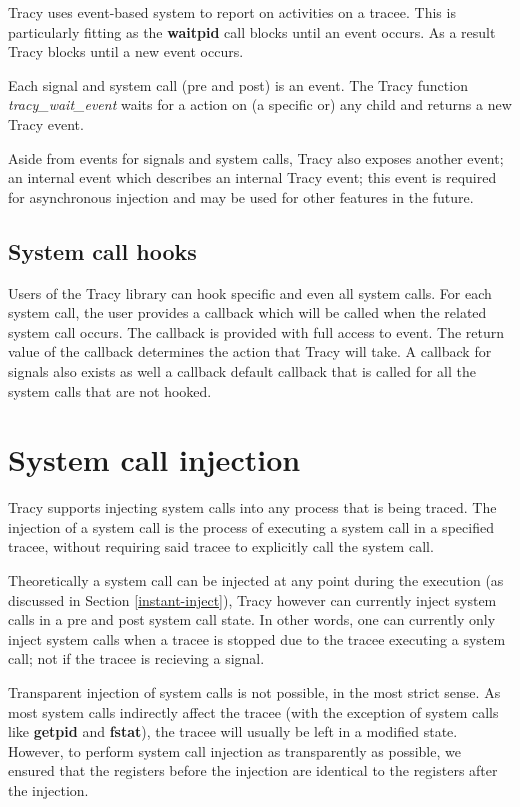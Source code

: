 \documentclass[a4paper, 10pt]{report}
\begin{document}
Tracy uses event-based system to report on activities on a tracee. This is
particularly fitting as the \textbf{waitpid} call blocks until an event
occurs. As a result Tracy blocks until a new event occurs.

Each signal and system call (pre and post) is an event.
The Tracy function \textit{tracy\_wait\_event} waits for a action on
(a specific or) any child and returns a new Tracy event.

Aside from events for signals and system calls, Tracy also exposes another
event; an internal event which describes an internal Tracy event; this event
is required for asynchronous injection and may be used for other features in
the future.

\subsection{System call hooks}

Users of the Tracy library can hook specific and even all system calls. For
each system call, the user provides a callback which will be called when
the related system call occurs. The callback is provided with full access to
event. The return value of the callback determines the action that Tracy
will take. A callback for signals also exists as well a callback default
callback that is called for all the system calls that are not hooked.

\section{System call injection}
\label{syscall-inject}

Tracy supports injecting system calls into any process that is being traced.
The injection of a system call is the process of executing a system call in
a specified tracee, without requiring said tracee to explicitly call the
system call.

Theoretically a system call can be injected at any point during
the execution (as discussed in Section \ref{instant-inject}),
Tracy however can currently inject system calls in a pre and post
system call state. In other words, one can currently only inject system calls
when a tracee is stopped due to the tracee executing a system call; not if
the tracee is recieving a signal.

Transparent injection of system calls is not possible, in the most strict sense.
As most system calls indirectly affect the tracee (with the exception of system
calls like \textbf{getpid} and \textbf{fstat}), the tracee will usually
be left in a modified state. However, to perform system call injection as
transparently as possible, we ensured that the registers before the injection
are identical to the registers after the injection.
\end{document}
